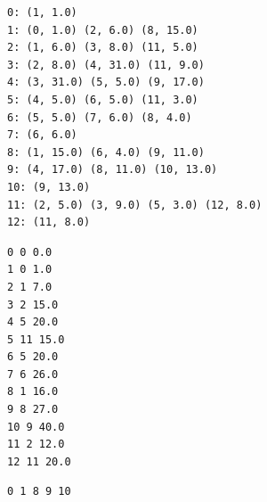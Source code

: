 \documentclass[a4paper]{article}
\begin{document}
\begin{large}
\newpage

\begin{lstlisting}[caption=Created graph shows source and destination vertices with weights]
0: (1, 1.0) 
1: (0, 1.0) (2, 6.0) (8, 15.0) 
2: (1, 6.0) (3, 8.0) (11, 5.0) 
3: (2, 8.0) (4, 31.0) (11, 9.0) 
4: (3, 31.0) (5, 5.0) (9, 17.0) 
5: (4, 5.0) (6, 5.0) (11, 3.0) 
6: (5, 5.0) (7, 6.0) (8, 4.0) 
7: (6, 6.0) 
8: (1, 15.0) (6, 4.0) (9, 11.0) 
9: (4, 17.0) (8, 11.0) (10, 13.0) 
10: (9, 13.0) 
11: (2, 5.0) (3, 9.0) (5, 3.0) (12, 8.0) 
12: (11, 8.0) 
\end{lstlisting}

\begin{lstlisting}[caption=Output of Dijkstras algorithm]
0 0 0.0
1 0 1.0
2 1 7.0
3 2 15.0
4 5 20.0
5 11 15.0
6 5 20.0
7 6 26.0
8 1 16.0
9 8 27.0
10 9 40.0
11 2 12.0
12 11 20.0
\end{lstlisting}


\begin{lstlisting}[caption=Shortest path]
0 1 8 9 10 
\end{lstlisting}

\end{large}
\end{document}
